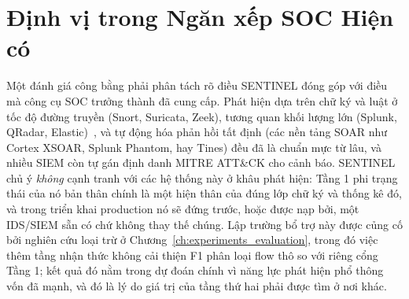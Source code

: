 \section{Định vị trong Ngăn xếp SOC Hiện có}
Một đánh giá công bằng phải phân tách rõ điều SENTINEL đóng góp với điều mà công cụ SOC trưởng thành đã cung cấp. Phát hiện dựa trên chữ ký và luật ở tốc độ đường truyền (Snort, Suricata, Zeek), tương quan khối lượng lớn (Splunk, QRadar, Elastic)~\cite{siem2021}, và tự động hóa phản hồi tất định (các nền tảng SOAR như Cortex XSOAR, Splunk Phantom, hay Tines) đều đã là chuẩn mực từ lâu, và nhiều SIEM còn tự gán định danh MITRE ATT\&CK cho cảnh báo. SENTINEL chủ ý \emph{không} cạnh tranh với các hệ thống này ở khâu phát hiện: Tầng 1 phi trạng thái của nó bản thân chính là một hiện thân của đúng lớp chữ ký và thống kê đó, và trong triển khai production nó sẽ đứng trước, hoặc được nạp bởi, một IDS/SIEM sẵn có chứ không thay thế chúng. Lập trường bổ trợ này được củng cố bởi nghiên cứu loại trừ ở Chương~\ref{ch:experiments_evaluation}, trong đó việc thêm tầng nhận thức không cải thiện F1 phân loại flow thô so với riêng cổng Tầng 1; kết quả đó nằm trong dự đoán chính vì năng lực phát hiện phổ thông vốn đã mạnh, và đó là lý do giá trị của tầng thứ hai phải được tìm ở nơi khác.

